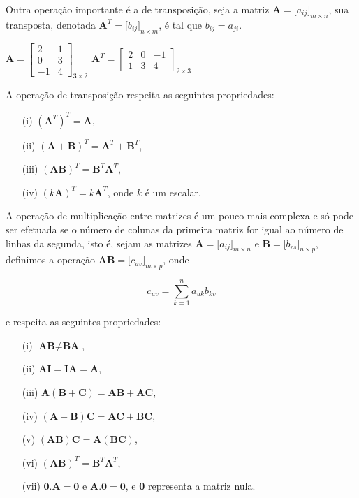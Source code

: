     Outra operação importante é a de transposição, seja a matriz $\textbf{A} = {[}a_{ij}{]}_{m \times n}$, sua transposta, denotada $\textbf{A}^T = {[}b_{ij}{]}_{n \times m}$, é tal que $b_{ij} = a_{ji}$. 
    
    \begin{center}
        $\textbf{A} = \begin{bmatrix}
           2  & 1 \\
           0  & 3 \\
           -1 & 4
        \end{bmatrix}_{3 \times 2}$
        $\textbf{A}^T = \begin{bmatrix}
           2 & 0 & -1 \\
           1 & 3 & 4
        \end{bmatrix}_{2 \times 3}$
    \end{center}

    A operação de transposição respeita as seguintes propriedades:
    \begin{itemize}
        \item[(i)] $(\textbf{A}^T)^T = \textbf{A}$,
        \item[(ii)] $(\textbf{A} + \textbf{B})^T = \textbf{A}^T + \textbf{B}^T$,
        \item[(iii)] $(\textbf{AB})^T = \textbf{B}^T \textbf{A}^T$,
        \item[(iv)] $(k \textbf{A})^T = k \textbf{A}^T$, onde $k$ é um escalar.
    \end{itemize}

    A operação de multiplicação entre matrizes é um pouco mais complexa e só pode ser efetuada se o número de colunas da primeira matriz for igual ao número de linhas da segunda, isto é, sejam as matrizes $\textbf{A} = {[}a_{ij}{]}_{m \times n}$ e $\textbf{B} = {[}b_{rs}{]}_{n \times p}$, definimos a operação $\textbf{AB} = {[}c_{uv}{]}_{m \times p}$, onde

                     $$c_{uv} = \sum_{k=1}^{n} a_{uk} b_{kv}$$

    \noindent
    e respeita as seguintes propriedades:
    \begin{itemize}
        \item[(i)] $\textbf{AB} \neq \textbf{BA}$,
        \item[(ii)] $\textbf{AI} = \textbf{IA} = \textbf{A}$,
        \item[(iii)] $\textbf{A}(\textbf{B} + \textbf{C}) = \textbf{AB} + \textbf{AC}$,
        \item [(iv)] $(\textbf{A} + \textbf{B})\textbf{C} = \textbf{AC} + \textbf{BC}$,
        \item [(v)] $(\textbf{AB})\textbf{C} = \textbf{A}(\textbf{BC})$,
        \item [(vi)] $(\textbf{AB})^T = \textbf{B}^T \textbf{A}^T$,
        \item [(vii)] $\textbf{0}.\textbf{A} = \textbf{0}$ e $\textbf{A}.\textbf{0} = \textbf{0}$, e \textbf{0} representa a matriz nula.
    \end{itemize}

